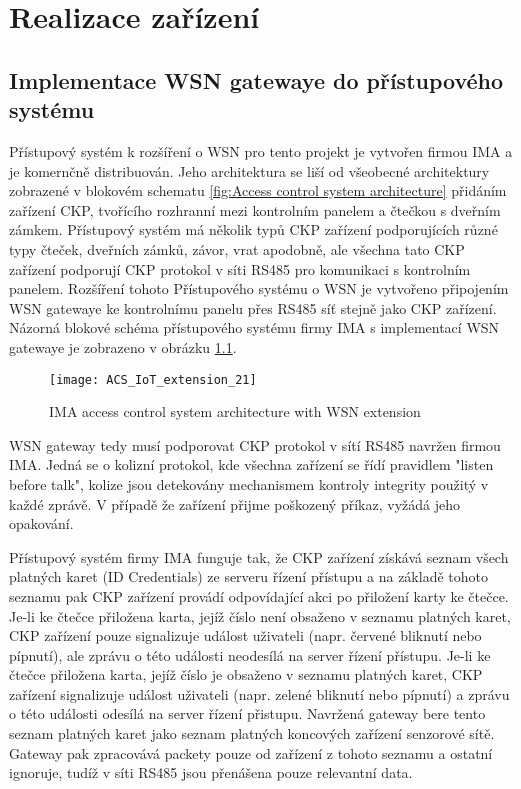 \chapter{Realizace zařízení}

\section{Implementace WSN gatewaye do přístupového systému}
Přístupový systém k rozšíření o WSN pro tento projekt je vytvořen firmou IMA a je komernčně distribuován. Jeho architektura se liší od všeobecné architektury zobrazené v blokovém schematu \ref{fig:Access control system architecture} přidáním zařízení CKP, tvořícího rozhranní mezi kontrolním panelem a čtečkou s dveřním zámkem. Přístupový systém má několik typů CKP zařízení podporujících různé typy čteček, dveřních zámků, závor, vrat apodobně, ale všechna tato CKP zařízení podporují CKP protokol v síti RS485 pro komunikaci s kontrolním panelem.
Rozšíření tohoto Přístupového systému o WSN je vytvořeno připojením WSN gatewaye ke kontrolnímu panelu přes RS485 síť stejně jako CKP zařízení. Názorná blokové schéma přístupového systému firmy IMA s implementací WSN gatewaye je zobrazeno v obrázku \ref{fig:ACS architecture IMA with geteway}.

\begin{figure}[!h]
\centering
\texttt{[image: ACS\_IoT\_extension\_21]}
\caption{IMA access control system architecture with WSN extension}
\label{fig:ACS architecture IMA with geteway}
\end{figure}

WSN gateway tedy musí podporovat CKP protokol v sítí RS485 navržen firmou IMA. Jedná se o kolizní protokol, kde všechna zařízení se řídí pravidlem "listen before talk", kolize jsou detekovány 
mechanismem kontroly integrity použitý v každé zprávě. V případě že zařízení přijme poškozený příkaz, vyžádá jeho opakování.

Přístupový systém firmy IMA funguje tak, že CKP zařízení získává seznam všech platných karet (ID Credentials) ze serveru řízení přístupu a na základě tohoto seznamu pak CKP zařízení provádí odpovídající akci po přiložení karty ke čtečce. 
Je-li ke čtečce přiložena karta, jejíž číslo není obsaženo v seznamu platných karet, CKP zařízení pouze signalizuje událost uživateli (napr. červené bliknutí nebo pípnutí), ale zprávu o této události neodesílá na server řízení přístupu. Je-li ke čtečce přiložena karta, jejíž číslo je obsaženo v seznamu platných karet, CKP zařízení signalizuje událost uživateli (napr. zelené bliknutí nebo pípnutí) a zprávu o této události odesílá na server řízení přistupu.
Navržená gateway bere tento seznam platných karet jako seznam platných koncových zařízení senzorové sítě. Gateway pak zpracovává packety pouze od zařízení z tohoto seznamu a ostatní ignoruje, tudíž v síti RS485 jsou přenášena pouze relevantní data.

